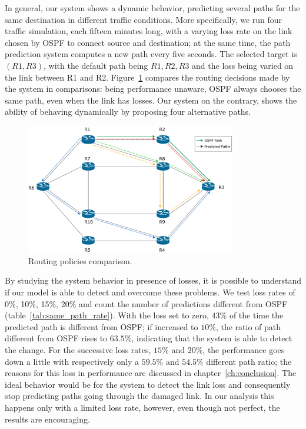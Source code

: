 In general, our system shows a dynamic behavior, predicting several paths for the same destination in different traffic conditions. More specifically, we run four traffic simulation, each fifteen minutes long, with a varying loss rate on the link chosen by OSPF to connect source and destination; at the same time, the path prediction system computes a new path every five seconds. The selected target is $(R1, R3)$, with the default path being $R1,R2,R3$ and the loss being varied on the link between R1 and R2. Figure~\ref{fig:path_cmp} compares the routing decisions made by the system in comparisons: being performance unaware, OSPF always chooses the same path, even when the link has losses. Our system on the contrary, shows the ability of behaving dynamically by proposing four alternative paths.

\begin{figure}[h]
\centering
\includegraphics[width=0.82\textwidth]{img/path_comparison}
\caption{Routing policies comparison.}
\label{fig:path_cmp}
\end{figure}
By studying the system behavior in presence of losses, it is possible to understand if our model is able to detect and overcome these problems. We test loss rates of 0\%, 10\%, 15\%, 20\% and count the number of predictions different from OSPF (table~\ref{tab:same_path_rate}). With the loss set to zero, $43\%$ of the time the predicted path is different from OSPF; if increased to $10\%$, the ratio of path different from OSPF rises to $63.5\%$, indicating that the system is able to detect the change. For the successive loss rates, $15\%$ and $20\%$, the performance goes down a little with respectively only a $59.5\%$ and $54.5\%$ different path ratio; the reasons for this loss in performance are discussed in chapter~\ref{ch:conclusion}. The ideal behavior would be for the system to detect the link loss and consequently stop predicting paths going through the damaged link. In our analysis this happens only with a limited loss rate, however, even though not perfect, the results are encouraging.

